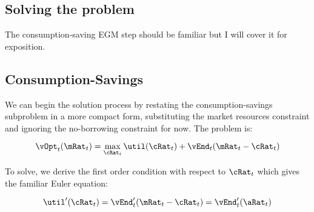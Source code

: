 \documentclass[\econtexRoot/EGMN]{subfiles}
\begin{document}
%

\subsection{Solving the problem}

The consumption-saving EGM step should be familiar but I will cover it for exposition.

\subsection{Consumption-Savings}

We can begin the solution process by restating the consumption-savings subproblem in a more compact form, substituting the market resources constraint and ignoring the no-borrowing constraint for now. The problem is:

\begin{equation}
  \vOpt_{t}(\mRat_{t}) = \max_{\cRat_{t}} \util(\cRat_{t}) +
  \vEnd_{t}(\mRat_{t}-\cRat_{t})
\end{equation}

To solve, we derive the first order condition with respect to $\cRat_{t}$ which gives the familiar Euler equation:

\begin{equation}
  \util'(\cRat_t) = \vEnd_{t}'(\mRat_{t} - \cRat_{t}) =
  \vEnd_{t}'(\aRat_{t})
\end{equation}
\end{document}

